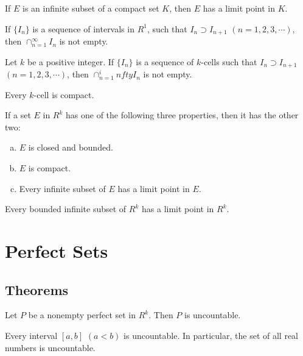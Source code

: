 \begin{thm}
	If $E$ is an infinite subset of a compact set $K$, then $E$ has a limit point in $K$.
\end{thm}

\begin{thm}
	If $\{I_n\}$ is a sequence of intervals in $R^1$, such that $I_n \supset I_{n+1}$ $(n=1,2,3,\cdots)$, then $\cap_{n=1}^\infty I_n$ is not empty.
\end{thm}

\begin{thm}
	Let $k$ be a positive integer. If $\{I_n\}$ is a sequence of $k$-cells such that $I_n \supset I_{n+1}$ $(n=1,2,3,\cdots)$, then $\cap_{n=1}^infty I_n$ is not empty.
\end{thm}

\begin{thm}
	Every $k$-cell is compact.
\end{thm}

\begin{thm}
	If a set $E$ in $R^k$ has one of the following three properties, then it has the other two:
	\begin{enumerate}[(a)]
		\item $E$ is closed and bounded.
		\item $E$ is compact.
		\item Every infinite subset of $E$ has a limit point in $E$.
	\end{enumerate}
\end{thm}

\begin{thm}
	Every bounded infinite subset of $R^k$ has a limit point in $R^k$.
\end{thm}

\section{Perfect Sets}
\subsection{Theorems}
\begin{thm}
	Let $P$ be a nonempty perfect set in $R^k$. Then $P$ is uncountable.
\end{thm}

\begin{cor}
	Every interval $[a,b]$ $(a < b)$ is uncountable. In particular, the set of all real numbers is uncountable.
\end{cor}

